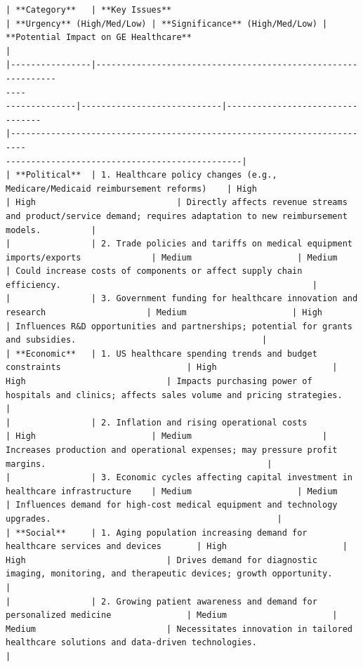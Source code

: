 \begin{instructbox}
\begin{lstlisting}[breakindent=0pt, breaklines=true, breakatwhitespace=true, frame=single, backgroundcolor=\color{green!10}]
| **Category**   | **Key Issues**                                                                 | **Urgency** (High/Med/Low) | **Significance** (High/Med/Low) | **Potential Impact on GE Healthcare**                                                                                  |
|----------------|--------------------------------------------------------------
----
--------------|----------------------------|---------------------------------
|-------------------------------------------------------------------------
-----------------------------------------------|
| **Political**  | 1. Healthcare policy changes (e.g., Medicare/Medicaid reimbursement reforms)    | High                       | High                            | Directly affects revenue streams and product/service demand; requires adaptation to new reimbursement models.          |
|                | 2. Trade policies and tariffs on medical equipment imports/exports              | Medium                     | Medium                          | Could increase costs of components or affect supply chain efficiency.                                                  |
|                | 3. Government funding for healthcare innovation and research                    | Medium                     | High                            | Influences R&D opportunities and partnerships; potential for grants and subsidies.                                     |
| **Economic**   | 1. US healthcare spending trends and budget constraints                         | High                       | High                            | Impacts purchasing power of hospitals and clinics; affects sales volume and pricing strategies.                        |
|                | 2. Inflation and rising operational costs                                      | High                       | Medium                          | Increases production and operational expenses; may pressure profit margins.                                            |
|                | 3. Economic cycles affecting capital investment in healthcare infrastructure    | Medium                     | Medium                          | Influences demand for high-cost medical equipment and technology upgrades.                                             |
| **Social**     | 1. Aging population increasing demand for healthcare services and devices       | High                       | High                            | Drives demand for diagnostic imaging, monitoring, and therapeutic devices; growth opportunity.                         |
|                | 2. Growing patient awareness and demand for personalized medicine               | Medium                     | Medium                          | Necessitates innovation in tailored healthcare solutions and data-driven technologies.                                 |

\end{lstlisting}
\end{instructbox}
